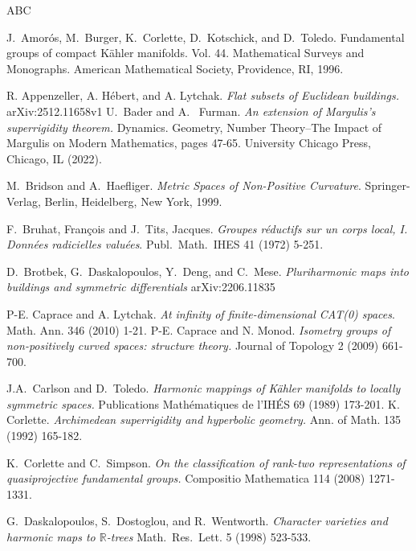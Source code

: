 \documentclass[12pt]{amsart}
\theoremstyle{definition}
\numberwithin{equation}{section}
\newcommand{\R}{\mathbb R}
\begin{document}
 \begin{thebibliography}{ABC}
\label{references}

 J.~Amor\'os, M.~Burger, K.~Corlette, D.~Kotschick, and D.~Toledo. Fundamental groups of compact K\"ahler manifolds. Vol. 44. Mathematical Surveys and Monographs.
American Mathematical Society, Providence, RI, 1996.

 R. Appenzeller, A. H\'ebert, and A. Lytchak. {\it Flat subsets of Euclidean buildings.} arXiv:2512.11658v1
 U.~Bader and A. ~Furman. {\it An extension of Margulis’s superrigidity theorem.} Dynamics. Geometry, Number Theory--The Impact of Margulis on Modern Mathematics, pages 47-65. University Chicago Press, Chicago, IL (2022).

 M.~Bridson and A.~Haefliger.  {\it Metric Spaces of Non-Positive Curvature}. Springer-Verlag, Berlin, Heidelberg, New York, 1999.

F.~Bruhat, François and J.~Tits, Jacques. {\it Groupes r\'eductifs sur un corps local, I. Donn\'ees radicielles valu\'ees}. Publ.~Math.~IHES 41 (1972) 5-251.

D.~Brotbek, G.~Daskalopoulos, Y.~Deng, and C.~Mese.
{\it Pluriharmonic maps into buildings and symmetric differentials} arXiv:2206.11835 

 P-E. Caprace and A. Lytchak. {\it At infinity of finite-dimensional CAT(0) spaces}. Math. Ann. 346 (2010) 1-21.
 P-E. Caprace and N. Monod. {\it Isometry groups of non-positively curved spaces: structure theory.}
Journal of Topology 2 (2009) 661-700.

 J.A.~Carlson and D.~Toledo.  {\it Harmonic mappings of Kähler manifolds to locally symmetric spaces.} Publications Math\'{e}matiques de l'IH\'{E}S 69 (1989) 173-201. 
\newblock K. Corlette.  {\em Archimedean superrigidity and hyperbolic geometry.} 
\newblock  Ann. of Math. 135 (1992) 165-182. 

 K.~Corlette and C.~Simpson. {\it On the classification of rank-two representations of quasiprojective fundamental groups.} Compositio Mathematica 114 (2008) 1271-1331.


 G.~Daskalopoulos, S.~Dostoglou, and R.~Wentworth.  {\it Character varieties and
harmonic maps to
$\R$-trees} Math.~Res.~Lett. 5 (1998) 523-533.




\end{thebibliography}
\end{document}

